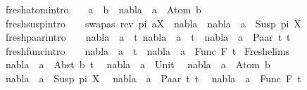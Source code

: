 \begin{isabellebody}
\ \ fresh{\isacharunderscore}{\kern0pt}atom{\isacharbrackleft}{\kern0pt}intro{\isacharbang}{\kern0pt}{\isacharbrackright}{\kern0pt}{\isacharcolon}{\kern0pt}\ \ \ \ {\isachardoublequoteopen}a\ {\isasymnoteq}\ b\ {\isasymLongrightarrow}\ nabla\ {\isasymturnstile}\ a\ {\isasymsharp}\ Atom\ b{\isachardoublequoteclose}\ {\isacharbar}{\kern0pt}\isanewline
\ \ fresh{\isacharunderscore}{\kern0pt}susp{\isacharbrackleft}{\kern0pt}intro{\isacharbang}{\kern0pt}{\isacharbrackright}{\kern0pt}{\isacharcolon}{\kern0pt}\ \ \ \ {\isachardoublequoteopen}{\isacharparenleft}{\kern0pt}swapas\ {\isacharparenleft}{\kern0pt}rev\ pi{\isacharparenright}{\kern0pt}\ a{\isacharcomma}{\kern0pt}X{\isacharparenright}{\kern0pt}\ {\isasymin}\ nabla\ {\isasymLongrightarrow}\ nabla\ {\isasymturnstile}\ a\ {\isasymsharp}\ Susp\ pi\ X{\isachardoublequoteclose}\ {\isacharbar}{\kern0pt}\isanewline
\ \ fresh{\isacharunderscore}{\kern0pt}paar{\isacharbrackleft}{\kern0pt}intro{\isacharbang}{\kern0pt}{\isacharbrackright}{\kern0pt}{\isacharcolon}{\kern0pt}\ \ \ \ {\isachardoublequoteopen}{\isasymlbrakk}nabla\ {\isasymturnstile}\ a\ {\isasymsharp}\ t{}{\isacharsemicolon}{\kern0pt}\ nabla\ {\isasymturnstile}\ a\ {\isasymsharp}\ t{}{\isasymrbrakk}\ {\isasymLongrightarrow}\ nabla\ {\isasymturnstile}\ a\ {\isasymsharp}\ Paar\ t{}\ t{}{\isachardoublequoteclose}\ {\isacharbar}{\kern0pt}\isanewline
\ \ fresh{\isacharunderscore}{\kern0pt}func{\isacharbrackleft}{\kern0pt}intro{\isacharbang}{\kern0pt}{\isacharbrackright}{\kern0pt}{\isacharcolon}{\kern0pt}\ \ \ \ {\isachardoublequoteopen}nabla\ {\isasymturnstile}\ a\ {\isasymsharp}\ t\ {\isasymLongrightarrow}\ nabla\ {\isasymturnstile}\ a\ {\isasymsharp}\ Func\ F\ t{\isachardoublequoteclose}\isanewline
\isanewline
{}\isamarkupfalse%
\ Fresh{\isacharunderscore}{\kern0pt}elims{\isacharcolon}{\kern0pt}\isanewline
\ \ {\isachardoublequoteopen}nabla\ {\isasymturnstile}\ a\ {\isasymsharp}\ Abst\ b\ t{\isachardoublequoteclose}\isanewline
\ \ {\isachardoublequoteopen}nabla\ {\isasymturnstile}\ a\ {\isasymsharp}\ Unit{\isachardoublequoteclose}\isanewline
\ \ {\isachardoublequoteopen}nabla\ {\isasymturnstile}\ a\ {\isasymsharp}\ Atom\ b{\isachardoublequoteclose}\isanewline
\ \ {\isachardoublequoteopen}nabla\ {\isasymturnstile}\ a\ {\isasymsharp}\ Susp\ pi\ X{\isachardoublequoteclose}\isanewline
\ \ {\isachardoublequoteopen}nabla\ {\isasymturnstile}\ a\ {\isasymsharp}\ Paar\ t{}\ t{}{\isachardoublequoteclose}\isanewline
\ \ {\isachardoublequoteopen}nabla\ {\isasymturnstile}\ a\ {\isasymsharp}\ Func\ F\ t{\isachardoublequoteclose}\isanewline

\end{isabellebody}
